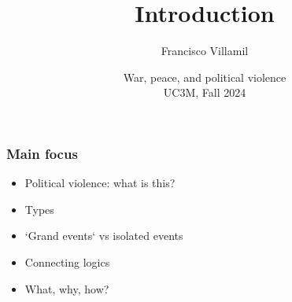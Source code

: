 \documentclass[aspectratio=43]{beamer}
\title{\Huge Introduction}
\author{Francisco Villamil}
\date{War, peace, and political violence\\UC3M, Fall 2024}
\begin{document}
\begin{frame}
  \titlepage
\end{frame}



\begin{frame}
\frametitle{Main focus}
\centering

\begin{itemize}[<+->]
\item Political violence: what is this?
\item Types
\item `Grand events` vs isolated events
\item Connecting logics
\item What, why, how?
\end{itemize}

\end{frame}


\end{document}

